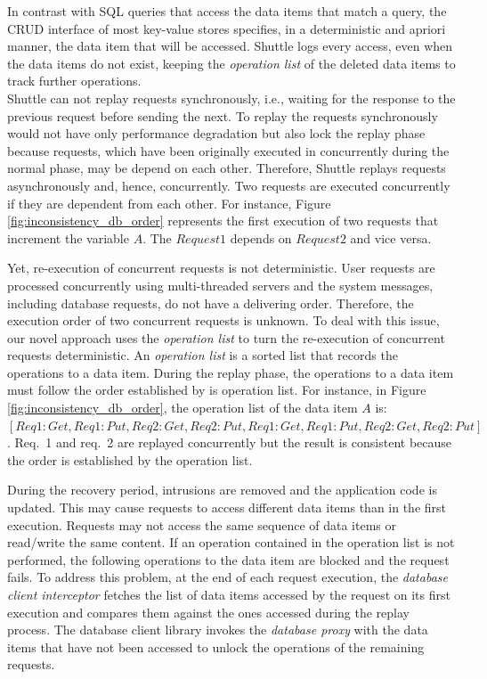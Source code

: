 In contrast with SQL queries that access the data items that match a query, the \ac{CRUD} interface of most key-value stores specifies, in a deterministic and apriori manner, the data item that will be accessed. Shuttle logs every access, even when the data items do not exist, keeping the \emph{operation list} of the deleted data items to track further operations.\\


Shuttle can not replay requests synchronously, i.e., waiting for the response to the previous request before sending the next. To replay the requests synchronously would not have only performance degradation but also lock the replay phase because requests, which have been originally executed in concurrently during the normal phase, may be depend on each other. Therefore, Shuttle replays requests asynchronously and, hence, concurrently. Two requests are executed concurrently if they are dependent from each other. For instance, Figure \ref{fig:inconsistency_db_order} represents the first execution of two requests that increment the variable $A$. The $Request 1$ depends on $Request 2$ and vice versa. 

Yet, re-execution of concurrent requests is not deterministic. User requests are processed concurrently using multi-threaded servers and the system messages, including database requests, do not have a delivering order. Therefore, the execution order of two concurrent requests is unknown. To deal with this issue, our novel approach uses the \emph{operation list} to turn the re-execution of concurrent requests deterministic. An \emph{operation list} is a sorted list that records the operations to a data item. During the replay phase, the operations to a data item must follow the order established by is operation list. For instance, in Figure \ref{fig:inconsistency_db_order}, the operation list of the data item $A$ is: $[Req1:Get, Req1:Put, Req2:Get, Req2:Put, Req1:Get, Req1:Put, Req2:Get, Req2:Put]$. {Req.~1} and {req.~2} are replayed concurrently but the result is consistent because the order is established by the operation list.

During the recovery period, intrusions are removed and the application code is updated. This may cause requests to access different data items than in the first execution. Requests may not access the same sequence of data items or read/write the same content. If an operation contained in the operation list is not performed, the following operations to the data item are blocked and the request fails. To address this problem, at the end of each request execution, the \textit{database client interceptor} fetches the list of data items accessed by the request on its first execution and compares them against the ones accessed during the replay process. The database client library invokes the \emph{database proxy} with the data items that have not been accessed to unlock the operations of the remaining requests. 

